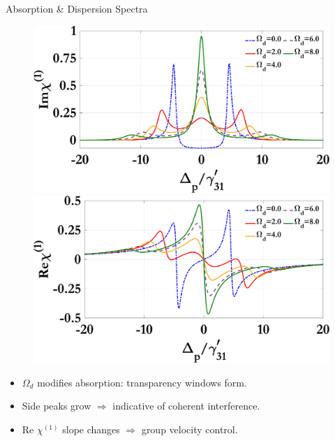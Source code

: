 \documentclass[12pt,aspectratio=1610]{beamer}
\begin{document}
\begin{frame}{Absorption \& Dispersion Spectra}
  \vspace{-37pt}
  \begin{figure}[h]
    \centering
    \begin{minipage}{0.48\textwidth}
      \centering
      \includegraphics[width=\linewidth]{Assets/Img_chi1_Omega_d.jpeg}
      \subcaption{}
    \end{minipage}
    \hfill
    \begin{minipage}{0.48\textwidth}
      \centering
      \includegraphics[width=\linewidth]{Assets/Real_chi1_Omega_d.jpeg}
      \subcaption{}
    \end{minipage}\label{fig:chi1_d}
   \end{figure}
   \begin{itemize}
    \item $\Omega_d$ modifies absorption: transparency windows form.
    \item Side peaks grow $\Rightarrow$ indicative of coherent interference.
    \item Re $\chi^{(1)}$ slope changes $\Rightarrow$ group velocity control.
  \end{itemize}
\end{frame}
\end{document}
